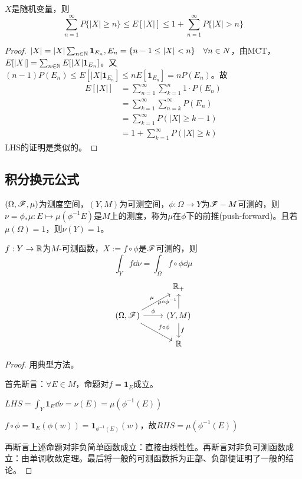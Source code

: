 \documentclass{ctexbook}
\begin{document}
\begin{Prop}[Layered公式]
  $X$是随机变量，则\[\sum_{n=1}^{\infty}P\{|X|\geq n\}\leq E[|X|]\leq 1+\sum_{n=1}^{\infty}P\{|X|>n\}\]
\end{Prop}
\begin{proof}
  $|X|=|X|\sum_{n\in\mathbb{N}}\bm 1_{E_{n}},E_{n}=\{n-1\leq|X|< n\}\quad\forall n\in N$，由MCT，$E[|X|]=\sum_{n\in\mathbb{N}}E[|X|\bm 1_{E_{n}}]$。又$(n-1)P(E_{n})\leq E[|X|\bm 1_{E_{n}}]\leq nE[\bm 1_{E_{n}}]=nP(E_{n})$。故
\begin{align*}
  E[|X|]&=\sum_{n=1}^{\infty}\sum_{k=1}^{n}1\cdot P(E_{n})\\
        &=\sum_{k=1}^{\infty}\sum_{n=k}^{\infty}P(E_{n})\\
        &=\sum_{k=1}^{\infty}P(|X|\geq k-1)\\
        &=1+\sum_{k=1}^{\infty}P(|X|\geq k)
\end{align*}
    LHS的证明是类似的。
\end{proof}

\subsection{积分换元公式}
\begin{Thm}
  $(\Omega,\mathscr{F},\mu)$为测度空间，$(Y,M)$为可测空间，$\phi: \Omega\to Y$为$\mathscr{F}-M$可测的，则$\nu=\phi_{*}\mu: E\mapsto \mu(\phi^{-1}E)$是$M$上的测度，称为$\mu$在$\phi$下的前推(push-forward)。且若$\mu(\Omega)=1$，则$\nu(Y)=1$。

  $f:Y\to\mathbb{R}$为$M$-可测函数，$X:=f\circ \phi$是$\mathscr{F}$可测的，则
  \[\int_{Y}f\dd\nu=\int_{\Omega}f\circ\phi\dd\mu\]
  \[
\begin{tikzcd}                                                                                   & \mathbb{R}_+                                           \\
{(\Omega,\mathscr{F})} \arrow[ru, "\mu", shift right] \arrow[r, "\phi"] \arrow[rd, "f\circ \phi"] & {(Y,M)} \arrow[u, "\mu\circ \phi^{-1}"] \arrow[d, "f"] \\
                                                                                                  & \mathbb{R}                                            
\end{tikzcd}  \]
  
\end{Thm}

\begin{proof}
  用典型方法。

  首先断言：$\forall E\in M$，命题对$f=\bm 1_{E}$成立。

  $LHS=\int_{Y}\bm 1_{E}\dd\nu=\nu(E)=\mu(\phi^{-1}(E))$

  $f\circ \phi=\bm 1_{E}(\phi(w))=\bm 1_{\phi^{-1}(E)}(w)$，故$RHS=\mu(\phi^{-1}(E))$

  再断言上述命题对非负简单函数成立：直接由线性性。再断言对非负可测函数成立：由单调收敛定理。最后将一般的可测函数拆为正部、负部便证明了一般的结论。
\end{proof}
\end{document}
